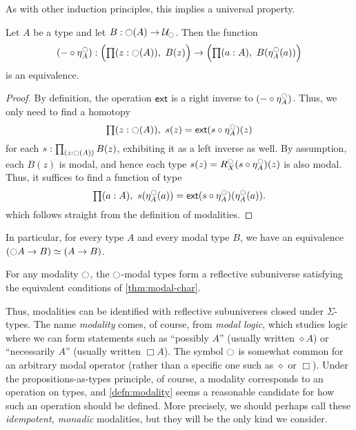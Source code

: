 As with other induction principles, this implies a universal property.

\begin{thm}\label{prop:lv_n_deptype_sec_equiv_by_precomp}
Let $A$ be a type and let $B:\ocircle(A)\to\mathcal{U}_{\ocircle}$. Then the function
\begin{equation*}
(-\circ \mreturn^\modal_A) : \Big(\prd{z:\modal(A)}B(z)\Big) \to \Big(\prd{a:A}B(\mreturn^\modal_A(a))\Big)
\end{equation*}
is an equivalence.
\end{thm}
\begin{proof}
By definition, the operation $\mathsf{ext}$ is a right inverse to $(-\circ \eta^{\ocircle}_A)$.
Thus, we only need to find a homotopy
\begin{equation*}
\prd{z:\modal(A)}s(z)= \ext(s\circ \mreturn^\modal_A)(z)
\end{equation*}
for each $s:\prd{z:\modal(A)}B(z)$, exhibiting it as a left inverse as well.
By assumption, each $B(z)$ is modal, and hence each type $s(z)= R^{\ocircle}_X(s\circ \eta^{\ocircle}_A)(z)$
is also modal.
Thus, it suffices to find a function of type
\begin{equation*}
\prd{a:A}s(\mreturn^\modal_A(a))= \ext(s\circ \mreturn^\modal_A)(\mreturn^\modal_A(a)).
\end{equation*}
which follows straight from the definition of modalities.
\end{proof}

In particular, for every type $A$ and every modal type $B$, we have an equivalence $(\ocircle A\to B)\simeq (A\to B)$.

\begin{cor}
  For any modality $\ocircle$, the $\ocircle$-modal types form a reflective subuniverse satisfying the equivalent conditions of \autoref{thm:modal-char}.
\end{cor}

Thus, modalities can be identified with reflective subuniverses closed under $\Sigma$-types.
The name \emph{modality} comes, of course, from \emph{modal logic}, which studies logic where we can form statements such as ``possibly $A$'' (usually written $\diamond A$) or ``necessarily $A$'' (usually written $\Box A$).
The symbol $\ocircle$ is somewhat common for an arbitrary modal operator (rather than a specific one such as $\diamond$ or $\Box$).
Under the propositions-as-types principle, of course, a modality corresponds to an operation on types, and \autoref{defn:modality} seems a reasonable candidate for how such an operation should be defined.
More precisely, we should perhaps call these \emph{idempotent, monadic} modalities, but they will be the only kind we consider.


